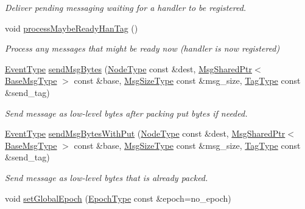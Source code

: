 \begin{DoxyCompactItemize}
\begin{DoxyCompactList}\small\item\em Deliver pending messaging waiting for a handler to be registered. \end{DoxyCompactList}\item 
void \hyperlink{structvt_1_1messaging_1_1_active_messenger_ac9fcc6ef325258985074c699b0d783c6}{process\+Maybe\+Ready\+Han\+Tag} ()
\begin{DoxyCompactList}\small\item\em Process any messages that might be ready now (handler is now registered) \end{DoxyCompactList}\item 
\hyperlink{namespacevt_a009267401def7ae8bf201892222d060f}{Event\+Type} \hyperlink{structvt_1_1messaging_1_1_active_messenger_ab3542048b6c0f380899643b031eb1731}{send\+Msg\+Bytes} (\hyperlink{namespacevt_a866da9d0efc19c0a1ce79e9e492f47e2}{Node\+Type} const \&dest, \hyperlink{structvt_1_1messaging_1_1_msg_shared_ptr}{Msg\+Shared\+Ptr}$<$ \hyperlink{namespacevt_a44d0d4e144748f2b19a1cfd962f50338}{Base\+Msg\+Type} $>$ const \&base, \hyperlink{namespacevt_abfa009d900299ac1df967b40ea8f2c8a}{Msg\+Size\+Type} const \&msg\+\_\+size, \hyperlink{namespacevt_a84ab281dae04a52a4b243d6bf62d0e52}{Tag\+Type} const \&send\+\_\+tag)
\begin{DoxyCompactList}\small\item\em Send message as low-\/level bytes after packing put bytes if needed. \end{DoxyCompactList}\item 
\hyperlink{namespacevt_a009267401def7ae8bf201892222d060f}{Event\+Type} \hyperlink{structvt_1_1messaging_1_1_active_messenger_a46c03a8a4da878972eda8db2d3f1cc1d}{send\+Msg\+Bytes\+With\+Put} (\hyperlink{namespacevt_a866da9d0efc19c0a1ce79e9e492f47e2}{Node\+Type} const \&dest, \hyperlink{structvt_1_1messaging_1_1_msg_shared_ptr}{Msg\+Shared\+Ptr}$<$ \hyperlink{namespacevt_a44d0d4e144748f2b19a1cfd962f50338}{Base\+Msg\+Type} $>$ const \&base, \hyperlink{namespacevt_abfa009d900299ac1df967b40ea8f2c8a}{Msg\+Size\+Type} const \&msg\+\_\+size, \hyperlink{namespacevt_a84ab281dae04a52a4b243d6bf62d0e52}{Tag\+Type} const \&send\+\_\+tag)
\begin{DoxyCompactList}\small\item\em Send message as low-\/level bytes that is already packed. \end{DoxyCompactList}\item 
void \hyperlink{structvt_1_1messaging_1_1_active_messenger_aa17a3e718783d3aa08cd61d81abeb6a5}{set\+Global\+Epoch} (\hyperlink{namespacevt_a985a5adf291c34a3ca263b3378388236}{Epoch\+Type} const \&epoch=no\+\_\+epoch)

\end{DoxyCompactItemize}
